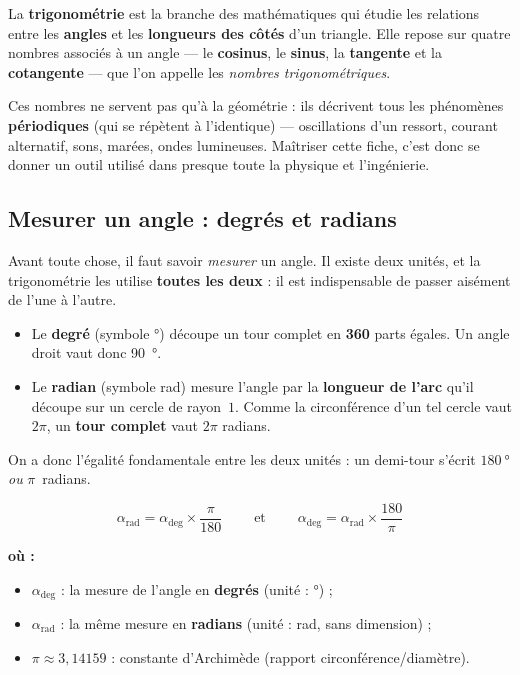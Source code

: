 \documentclass[11pt,a4paper]{article}
\newenvironment{ou}{%
  \par\smallskip\noindent\textbf{où :}\nopagebreak
  \begin{itemize}[leftmargin=1.8em,topsep=2pt,itemsep=1.5pt,parsep=0pt]}%
  {\end{itemize}}
\begin{document}
\begin{definition}[la trigonométrie]
La \textbf{trigonométrie} est la branche des mathématiques qui étudie les relations entre les
\textbf{angles} et les \textbf{longueurs des côtés} d'un triangle. Elle repose sur quatre nombres
associés à un angle --- le \textbf{cosinus}, le \textbf{sinus}, la \textbf{tangente} et la
\textbf{cotangente} --- que l'on appelle les \emph{nombres trigonométriques}.
\end{definition}

Ces nombres ne servent pas qu'à la géométrie : ils décrivent tous les phénomènes \textbf{périodiques}
(qui se répètent à l'identique) --- oscillations d'un ressort, courant alternatif, sons, marées, ondes
lumineuses. Maîtriser cette fiche, c'est donc se donner un outil utilisé dans presque toute la physique
et l'ingénierie.

\subsection{Mesurer un angle : degrés et radians}
Avant toute chose, il faut savoir \emph{mesurer} un angle. Il existe deux unités, et la trigonométrie
les utilise \textbf{toutes les deux} : il est indispensable de passer aisément de l'une à l'autre.

\begin{definition}
\begin{itemize}[leftmargin=1.5em,topsep=2pt,itemsep=2pt]
  \item Le \textbf{degré} (symbole \si{\degree}) découpe un tour complet en \textbf{360} parts égales.
        Un angle droit vaut donc \SI{90}{\degree}.
  \item Le \textbf{radian} (symbole \si{\radian}) mesure l'angle par la \textbf{longueur de l'arc}
        qu'il découpe sur un cercle de rayon~$1$. Comme la circonférence d'un tel cercle vaut $2\pi$,
        un \textbf{tour complet} vaut $2\pi$ radians.
\end{itemize}
\end{definition}

On a donc l'égalité fondamentale entre les deux unités : un demi-tour s'écrit
$\SI{180}{\degree}$ \emph{ou} $\pi$~radians.

\begin{formule}
\[
\boxed{\;\alpha_{\text{rad}} = \alpha_{\text{deg}}\times \dfrac{\pi}{180}\;}
\qquad\text{et}\qquad
\boxed{\;\alpha_{\text{deg}} = \alpha_{\text{rad}}\times \dfrac{180}{\pi}\;}
\]
\begin{ou}
  \item $\alpha_{\text{deg}}$ : la mesure de l'angle en \textbf{degrés} (unité : \si{\degree}) ;
  \item $\alpha_{\text{rad}}$ : la même mesure en \textbf{radians} (unité : \si{\radian}, sans dimension) ;
  \item $\pi \approx 3{,}14159$ : constante d'Archimède (rapport circonférence/diamètre).
\end{ou}
\end{formule}
\end{document}
